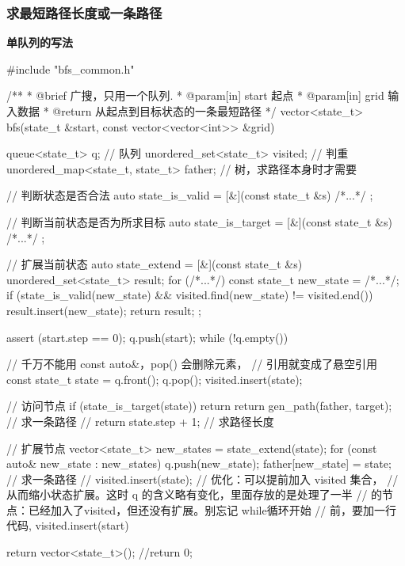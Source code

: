 \subsubsection{求最短路径长度或一条路径}

\textbf{单队列的写法}

\begin{Codex}[label=bfs_template.cpp]
#include "bfs_common.h"

/**
 * @brief 广搜，只用一个队列.
 * @param[in] start 起点
 * @param[in] grid 输入数据
 * @return 从起点到目标状态的一条最短路径
 */
vector<state_t> bfs(state_t &start, const vector<vector<int>> &grid) {
    queue<state_t> q; // 队列
    unordered_set<state_t> visited; // 判重
    unordered_map<state_t, state_t> father; // 树，求路径本身时才需要

    // 判断状态是否合法
    auto state_is_valid = [&](const state_t &s) { /*...*/ };

    // 判断当前状态是否为所求目标
    auto state_is_target = [&](const state_t &s) { /*...*/ };

    // 扩展当前状态
    auto state_extend = [&](const state_t &s) {
        unordered_set<state_t> result;
        for (/*...*/) {
            const state_t new_state = /*...*/;
            if (state_is_valid(new_state) && 
                    visited.find(new_state) != visited.end()) {
                result.insert(new_state);
            }
        }
        return result;
    };

    assert (start.step == 0);
    q.push(start);
    while (!q.empty()) {
        // 千万不能用 const auto&，pop() 会删除元素，
        // 引用就变成了悬空引用
        const state_t state = q.front();
        q.pop();
        visited.insert(state);

        // 访问节点
        if (state_is_target(state)) {
            return return gen_path(father, target); // 求一条路径
            // return state.step + 1; // 求路径长度
        }

        // 扩展节点
        vector<state_t> new_states = state_extend(state);
        for (const auto& new_state : new_states) {
            q.push(new_state);
            father[new_state] = state;  // 求一条路径
            // visited.insert(state); // 优化：可以提前加入 visited 集合，
            // 从而缩小状态扩展。这时 q 的含义略有变化，里面存放的是处理了一半
            // 的节点：已经加入了visited，但还没有扩展。别忘记 while循环开始
            // 前，要加一行代码, visited.insert(start)
        }
    }

    return vector<state_t>();
    //return 0;
}
\end{Codex}


